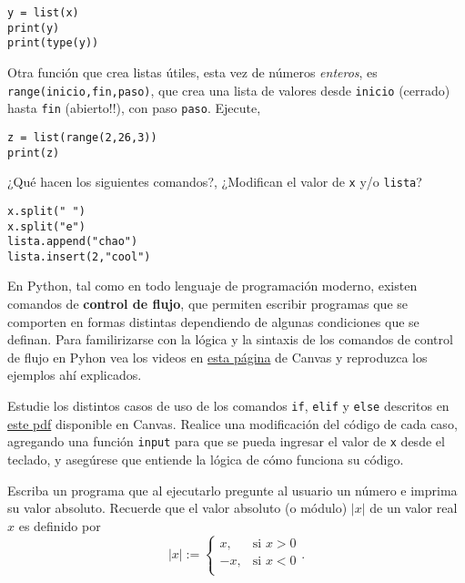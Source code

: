 \documentclass[11pt]{exam}
\begin{document}
\begin{questions}
\begin{verbatim}
y = list(x)
print(y)
print(type(y))
\end{verbatim}

\item Otra función que crea listas útiles, esta vez de números \textit{enteros}, es \texttt{range(inicio,fin,paso)}, que crea una lista de valores desde \texttt{inicio} (cerrado) hasta \texttt{fin} (abierto!!), con paso \texttt{paso}. Ejecute,

\begin{verbatim}
z = list(range(2,26,3))
print(z)
\end{verbatim}

\item ¿Qué hacen los siguientes comandos?, ¿Modifican el valor de \texttt{x} y/o \texttt{lista}?

\begin{verbatim}
x.split(" ")
x.split("e")
lista.append("chao")
lista.insert(2,"cool")
\end{verbatim}


\item En Python, tal como en todo lenguaje de programación moderno, existen comandos de  \textbf{control de flujo}, que permiten escribir programas que se comporten en formas distintas dependiendo de algunas condiciones que se definan. Para familirizarse con la lógica y la sintaxis de los comandos de control de flujo en Pyhon vea los videos en \href{https://udec.instructure.com/courses/51022/pages/control-de-flujo-if-elif-else?module_item_id=1904632}{esta página} de Canvas y reproduzca los ejemplos ahí explicados.

\item Estudie los distintos casos de uso de los comandos \texttt{if}, \texttt{elif} y \texttt{else} descritos en \href{https://udec.instructure.com/courses/51022/files/3076968?module_item_id=2001598}{este pdf} disponible en Canvas. Realice una modificación del código de cada caso, agregando una función \texttt{input} para que se pueda ingresar el valor de \texttt{x} desde el teclado, y asegúrese que entiende la lógica de cómo funciona su código.

\item Escriba un programa que al ejecutarlo pregunte al usuario un número e imprima su valor absoluto. Recuerde que el valor absoluto (o módulo) $|x|$ de un valor real $x$ es definido por
\begin{equation}
|x|:=\left\{\begin{array}{cl}
x, &\text{si } x>0 \\
-x, & \text{si } x<0 \\
\end{array}\right. .
\end{equation}


\end{questions}
\end{document}
